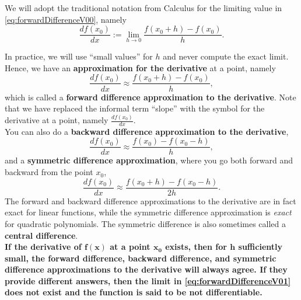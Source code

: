 \begin{tcolorbox}[title=\textbf{Numerical Approximations of a Derivative}]

We will adopt the traditional notation from Calculus for the limiting value in \eqref{eq:forwardDifferenceV00}, namely 
 \begin{equation}
\label{eq:forwardDifferenceV01}
    \frac{ df(x_0) }{d x}:= \lim_{h \to 0} \frac{f(x_0 + h) - f(x_0)}{h}.
\end{equation}

In practice, we will use ``small values'' for $h$ and never compute the exact limit. Hence, we have an \textbf{approximation for the derivative} at a point, namely
\begin{equation}
\label{eq:forwardDifference}
    \frac{df(x_0)}{dx}\approx \frac{f(x_0 + h) - f(x_0)}{h},
\end{equation}
which is called a \textbf{forward difference approximation to the derivative}. Note that we have replaced the informal term ``slope'' with the symbol for the derivative at a point, namely $\frac{df(x_0)}{dx}.$\\

You can also do a \textbf{backward difference approximation to the derivative},
\begin{equation}
\label{eq:backwardDifference}
   \frac{df(x_0)}{dx}\approx \frac{f(x_0) - f(x_0-  h)}{h},
\end{equation}
and a \textbf{symmetric difference approximation}, where you go both forward and backward from the point $x_0$,
\begin{equation}
\label{eq:symmetricDifference}
   \frac{df(x_0)}{dx}\approx \frac{f(x_0 + h)- f(x_0-  h)}{2 h}.
\end{equation}
The forward and backward difference approximations to the derivative are in fact exact for linear functions, while the symmetric difference approximation is \textit{exact} for quadratic polynomials. The symmetric difference is also sometimes called a \textbf{central difference}.\\

\textbf{If the derivative of $\mathbf{f(x)}$ at a point $\mathbf{x_0}$ exists, then for $\mathbf{h}$ sufficiently small, the forward difference, backward difference, and symmetric difference approximations to the derivative will always agree. If they provide different answers, then the limit in \eqref{eq:forwardDifferenceV01} does not exist and the function is said to be not differentiable.}

\end{tcolorbox}


